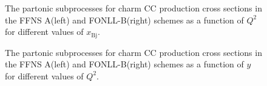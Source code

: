 \documentclass[pdftex,twocolumn,epjc3]{svjour3}          %
\newcommand{\xbj}{\ensuremath{x_{\text{Bj}}}\xspace}
\newcommand{\fonll} {{FONLL-B}\xspace}
\newcommand{\ffns} {{FFNS A}\xspace}
\begin{document}
\begin{figure}
    \centering
    \caption{The partonic subprocesses for charm CC production cross sections in the \ffns (left) and \fonll (right) schemes as a function of $Q^2$ for different values of \xbj.}
    \label{fig:partonic-q2}
\end{figure}

\begin{figure}
    \centering
    \caption{The partonic subprocesses for charm CC production cross sections in the \ffns (left) and \fonll (right) schemes as a function of $y$ for different values of $Q^2$.}
    \label{fig:partonic-y}
\end{figure}
\end{document}
